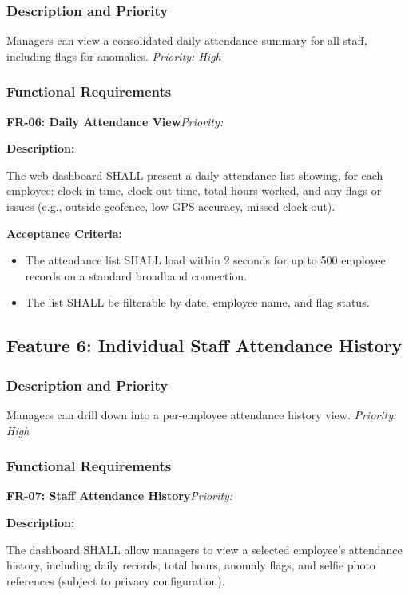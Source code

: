 \documentclass[12pt, a4paper]{article}
\newcommand{\frblock}[2]{%
    \noindent\textbf{#1}\hfill\textit{Priority: #2}%
    \par\smallskip%
}
\newcommand{\srsfield}[1]{\noindent\textbf{#1:}\par}
\begin{document}
\subsubsection*{Description and Priority}
Managers can view a consolidated daily attendance summary for all staff,
including flags for anomalies.
\hfill \textit{Priority: High}

\subsubsection*{Functional Requirements}

\frblock{FR-06: Daily Attendance View}{}

\srsfield{Description}
The web dashboard SHALL present a daily attendance list showing, for each
employee: clock-in time, clock-out time, total hours worked, and any
flags or issues (e.g., outside geofence, low GPS accuracy, missed
clock-out).

\srsfield{Acceptance Criteria}
\begin{itemize}
    \item The attendance list SHALL load within 2 seconds for up to
          500 employee records on a standard broadband connection.
    \item The list SHALL be filterable by date, employee name, and
          flag status.
\end{itemize}

\subsection{Feature 6: Individual Staff Attendance History}

\subsubsection*{Description and Priority}
Managers can drill down into a per-employee attendance history view.
\hfill \textit{Priority: High}

\subsubsection*{Functional Requirements}

\frblock{FR-07: Staff Attendance History}{}

\srsfield{Description}
The dashboard SHALL allow managers to view a selected employee's
attendance history, including daily records, total hours, anomaly flags,
and selfie photo references (subject to privacy configuration).
\end{document}
